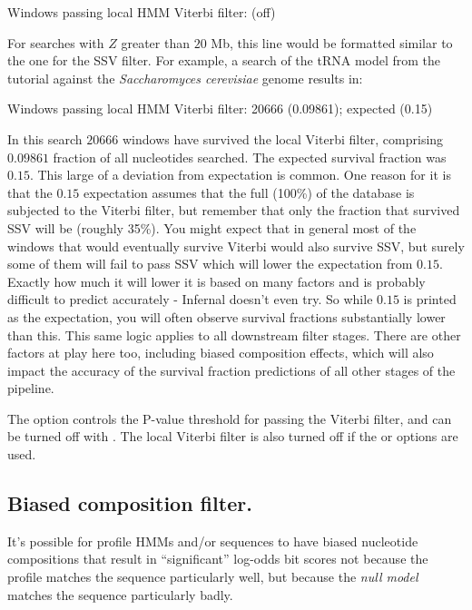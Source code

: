 \begin{sreoutput}
Windows   passing  local HMM Viterbi       filter:                  (off)

For searches with $Z$ greater than $20$ Mb, this line would be
formatted similar to the one for the SSV filter. For example,
a search of the tRNA model from the tutorial against the
\emph{Saccharomyces cerevisiae} genome results in:

\begin{sreoutput}
Windows   passing  local HMM Viterbi       filter:           20666  (0.09861); expected (0.15)
\end{sreoutput}

In this search $20666$ windows have survived the local Viterbi filter,
comprising $0.09861$ fraction of all nucleotides searched. The
expected survival fraction was $0.15$. This large of a deviation from
expectation is common. One reason for it is that the $0.15$
expectation assumes that the full (100\%) of the database is subjected
to the Viterbi filter, but remember that only the fraction that
survived SSV will be (roughly 35\%). You might expect that in general
most of the windows that would eventually survive Viterbi would also
survive SSV, but surely some of them will fail to pass SSV which will
lower the expectation from $0.15$. Exactly how much it will lower it
is based on many factors and is probably difficult to predict
accurately - Infernal doesn't even try. So while $0.15$ is printed as
the expectation, you will often observe survival fractions
substantially lower than this. This same logic applies to all
downstream filter stages. There are other factors at play here too,
including biased composition effects, which will also impact the
accuracy of the survival fraction predictions of all other stages of
the pipeline.

The  option controls the P-value threshold for passing
the Viterbi filter, and can be turned off with .  The
local Viterbi filter is also turned off if the  or
 options are used.

\subsection{Biased composition filter.}

It's possible for profile HMMs and/or sequences to have biased nucleotide
compositions that result in ``significant'' log-odds bit scores not
because the profile matches the sequence particularly well, but
because the \emph{null model} matches the sequence particularly badly.


\end{sreoutput}
